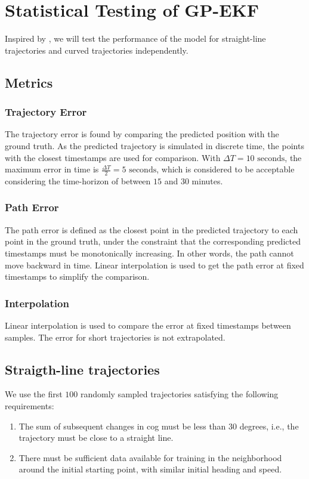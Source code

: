 \chapter{Statistical Testing of GP-EKF}\label{chap:stat_testing}
Inspired by \cite{hexeberg}, we will test the performance of the model for straight-line trajectories and curved trajectories independently.

\section{Metrics}
\subsection{Trajectory Error}
The trajectory error is found by comparing the predicted position with the ground truth. As the predicted trajectory is simulated in discrete time, the points with the closest timestamps are used for comparison. With $\Delta T = 10\text{ seconds}$, the maximum error in time is $\frac{\Delta T}{2} = 5 \text{ seconds}$, which is considered to be acceptable considering the time-horizon of between $15$ and $30$ minutes. 
\subsection{Path Error}
The path error is defined as the closest point in the predicted trajectory to each point in the ground truth, under the constraint that the corresponding predicted timestamps must be monotonically increasing. In other words, the path cannot move backward in time. Linear interpolation is used to get the path error at fixed timestamps to simplify the comparison. 

\subsection{Interpolation}
Linear interpolation is used to compare the error at fixed timestamps between samples. The error for short trajectories is not extrapolated.

\section{Straigth-line trajectories}
We use the first $100$ randomly sampled trajectories satisfying the following requirements:
\begin{enumerate}
    \item The sum of subsequent changes in \acrshort{cog} must be less than $30$ degrees, i.e., the trajectory must be close to a straight line.
    \item There must be sufficient data available for training in the neighborhood around the initial starting point, with similar initial heading and speed.
\end{enumerate}

